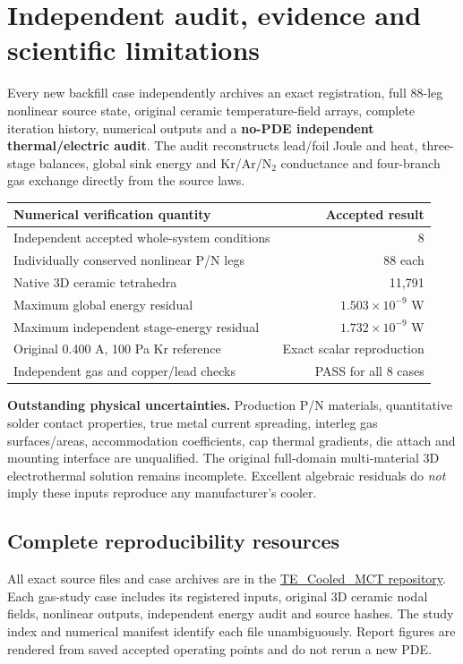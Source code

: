 \documentclass[10pt,a4paper]{article}
\begin{document}
\section{Independent audit, evidence and scientific limitations}
Every new backfill case independently archives an exact registration, full 88-leg nonlinear source state, original ceramic temperature-field arrays, complete iteration history, numerical outputs and a \textbf{no-PDE independent thermal/electric audit}. The audit reconstructs lead/foil Joule and heat, three-stage balances, global sink energy and Kr/Ar/N$_2$ conductance and four-branch gas exchange directly from the source laws.

\begin{center}\small
\begin{tabular}{lr}\toprule
Numerical verification quantity & Accepted result\\\midrule
Independent accepted whole-system conditions & 8\\
Individually conserved nonlinear P/N legs & 88 each\\
Native 3D ceramic tetrahedra & 11,791\\
Maximum global energy residual & $1.503\times10^{-9}$ W\\
Maximum independent stage-energy residual & $1.732\times10^{-9}$ W\\
Original 0.400 A, 100 Pa Kr reference & Exact scalar reproduction\\
Independent gas and copper/lead checks & PASS for all 8 cases\\\bottomrule
\end{tabular}
\end{center}
\textbf{Outstanding physical uncertainties.} Production P/N materials, quantitative solder contact properties, true metal current spreading, interleg gas surfaces/areas, accommodation coefficients, cap thermal gradients, die attach and mounting interface are unqualified. The original full-domain multi-material 3D electrothermal solution remains incomplete. Excellent algebraic residuals do \emph{not} imply these inputs reproduce any manufacturer's cooler.

\subsection{Complete reproducibility resources}
All exact source files and case archives are in the \href{https://github.com/Kajin-0/TE_Cooled_MCT}{TE\_Cooled\_MCT repository}. Each gas-study case includes its registered inputs, original 3D ceramic nodal fields, nonlinear outputs, independent energy audit and source hashes. The study index and numerical manifest identify each file unambiguously. Report figures are rendered from saved accepted operating points and do not rerun a new PDE.
\end{document}
